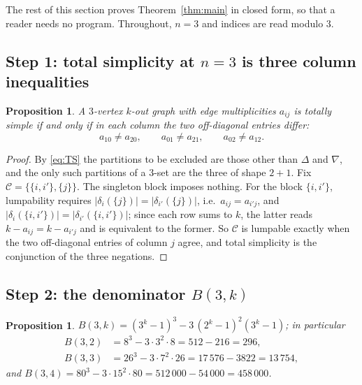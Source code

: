 \documentclass[11pt]{amsart}
\newtheorem{proposition}[theorem]{Proposition}
\theoremstyle{remark}
\begin{document}
The rest of this section proves Theorem~\ref{thm:main} in closed form, so that a reader
needs no program.  Throughout, $n=3$ and indices are read modulo $3$.

\subsection*{Step 1: total simplicity at $n=3$ is three column inequalities}

\begin{proposition}\label{prop:columns}
A $3$-vertex $k$-out graph with edge multiplicities $a_{ij}$ is totally simple if and only
if in each column the two off-diagonal entries differ:
\[
  a_{10}\neq a_{20},
  \qquad
  a_{01}\neq a_{21},
  \qquad
  a_{02}\neq a_{12}.
\]
\end{proposition}

\begin{proof}
By \eqref{eq:TS} the partitions to be excluded are those other than $\Delta$ and $\nabla$,
and the only such partitions of a $3$-set are the three of shape $2+1$.  Fix
$\mathcal C=\{\{i,i'\},\{j\}\}$.  The singleton block imposes nothing.  For the block
$\{i,i'\}$, lumpability requires $|\delta_i(\{j\})|=|\delta_{i'}(\{j\})|$, i.e.\
$a_{ij}=a_{i'j}$, and $|\delta_i(\{i,i'\})|=|\delta_{i'}(\{i,i'\})|$; since each row sums
to $k$, the latter reads $k-a_{ij}=k-a_{i'j}$ and is equivalent to the former.  So
$\mathcal C$ is lumpable exactly when the two off-diagonal entries of column $j$ agree, and
total simplicity is the conjunction of the three negations.
\end{proof}

\subsection*{Step 2: the denominator $B(3,k)$}

\begin{proposition}\label{prop:B}
$B(3,k)=(3^k-1)^3-3\,(2^k-1)^2(3^k-1)$; in particular
\begin{align*}
  B(3,2)&=8^3-3\cdot3^2\cdot8=512-216=296,\\
  B(3,3)&=26^3-3\cdot7^2\cdot26=17\,576-3822=13\,754,
\end{align*}
and $B(3,4)=80^3-3\cdot15^2\cdot80=512\,000-54\,000=458\,000$.
\end{proposition}
\end{document}
